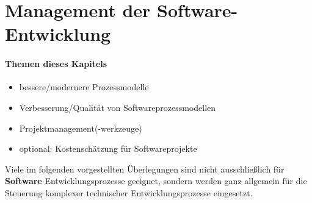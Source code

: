 \section{Management der Software-Entwicklung}

\paragraph{Themen dieses Kapitels}
\begin{itemize}
	\item bessere/modernere Prozessmodelle
	\item Verbesserung/Qualität von Softwareprozessmodellen
	\item Projektmanagement(-werkzeuge)
	\item optional: Kostenschätzung für Softwareprojekte
\end{itemize}

Viele im folgenden vorgestellten Überlegungen sind nicht ausschließlich für \textbf{Software} Entwicklungsprozesse geeignet, sondern werden ganz allgemein für die Steuerung komplexer technischer Entwicklungsprozesse eingesetzt.

